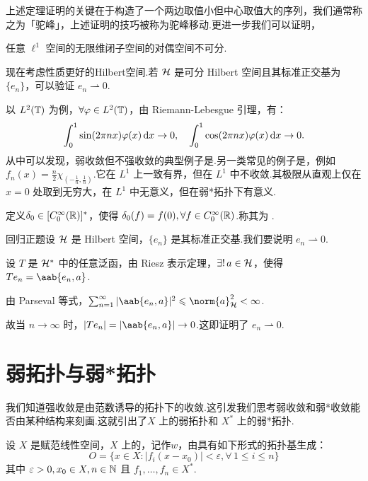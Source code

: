 上述定理证明的关键在于构造了一个两边取值小但中心取值大的序列，我们通常称之为「驼峰」，上述证明的技巧被称为驼峰移动.更进一步我们可以证明，

\begin{corollary}
    任意 $\ell^1$ 空间的无限维闭子空间的对偶空间不可分.
\end{corollary}

现在考虑性质更好的Hilbert空间.若 $\mathcal{H}$ 是可分 Hilbert 空间且其标准正交基为 $\{e_n\}$，可以验证 $e_n \rightharpoonup 0$.\par
以 $L^2(\mathbb{T})$ 为例，$\forall \varphi \in L^2(\mathbb{T})$，由 Riemann-Lebesgue 引理，有：
\begin{equation*}
    \int_0^1 \sin(2\pi nx)\varphi(x) \mathop{}\!\mathrm{d} x \to 0, \quad \int_0^1 \cos(2\pi nx)\varphi(x) \mathop{}\!\mathrm{d} x \to 0.
\end{equation*}
从中可以发现，弱收敛但不强收敛的典型例子是.另一类常见的例子是，例如 $f_n(x) = \frac{n}{2} \chi_{(-\frac{1}{n}, \frac{1}{n})}$.它在 $L^1$ 上一致有界，但在 $L^1$ 中不收敛.其极限从直观上仅在 $x=0$ 处取到无穷大，在 $L^1$ 中无意义，但在弱*拓扑下有意义.


\begin{definition}
    定义$\delta_0 \in [C_0^\infty(\mathbb{R})]^*$，使得 $\delta_0(f) = f(0), \forall f \in C_0^\infty(\mathbb{R})$.称其为 .
\end{definition}

回归正题设 $\mathcal{H}$ 是 Hilbert 空间，$\{e_n\}$ 是其标准正交基.我们要说明 $e_n \rightharpoonup 0$.\par
设 $T$ 是 $\mathcal{H}^*$ 中的任意泛函，由 Riesz 表示定理，$\exists !\, a \in \mathcal{H}$，使得 $T e_n = \aab{e_n, a}$.\par
由 Parseval 等式，$\sum_{n=1}^\infty |\aab{e_n, a}|^2 \leq \norm{a}_{\mcal{H}}^2 < \infty$.\par
故当 $n \to \infty$ 时，$|T e_n| = |\aab{e_n, a}| \to 0$.这即证明了 $e_n \rightharpoonup 0$.\par



\section{弱拓扑与弱*拓扑}

我们知道强收敛是由范数诱导的拓扑下的收敛.这引发我们思考弱收敛和弱*收敛能否由某种结构来刻画.这就引出了$X$ 上的弱拓扑和 $X^*$ 上的弱*拓扑.

\begin{definition}[弱拓扑]
    设 $X$ 是赋范线性空间，$X$ 上的，记作$w$，由具有如下形式的拓扑基生成：
    \begin{equation*}
        O = \{x \in X : |f_i(x - x_0)| < \varepsilon, \forall\,1 \leq i \leq n\}
    \end{equation*}
    其中 $\varepsilon > 0, x_0 \in X, n \in \mathbb{N}$ 且 $f_1, \dots, f_n \in X^*$.
\end{definition}

